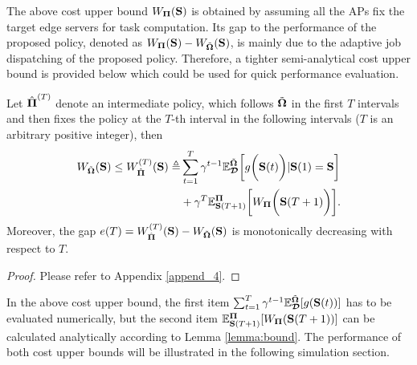 The above cost upper bound $W_{\boldsymbol{\Pi}}(\mathbf{S})$ is obtained by assuming all the APs fix the target edge servers for task computation.
Its gap to the performance of the proposed policy, denoted as $W_{\boldsymbol{\Pi}}(\mathbf{S}) - W_{\tilde{\boldsymbol{\Omega}}}(\mathbf{S})$, is mainly due to the adaptive job dispatching of the proposed policy.
Therefore, a tighter semi-analytical cost upper bound is provided below which could be used for quick performance evaluation.
\begin{lemma}
    Let $\hat{\boldsymbol{\Pi}}^{(T)}$ denote an intermediate policy, which follows $\tilde{\boldsymbol{\Omega}}$ in the first $T$ intervals and then fixes the policy at the $T$-th interval in the following intervals ($T$ is an arbitrary positive integer), then
    {\small
    \begin{align}
        W_{\tilde{\boldsymbol{\Omega}}}(\mathbf{S}) \leq W_{\hat{\boldsymbol{\Pi}}}^{(T)}(\mathbf{S})
        \triangleq &\sum_{t=1}^{T} \gamma^{t-1} \mathbb{E}^{\tilde{\boldsymbol{\Omega}}}_{\boldsymbol{\mathcal{D}}}\bigg[g\bigg(\mathbf{S}(t)\bigg) | \mathbf{S}(1)=\mathbf{S}\bigg]
        \\\nonumber
        &+\gamma^{T} \mathbb{E}^{\boldsymbol{\Pi}}_{\mathbf{S}(T+1)}\bigg[W_{\boldsymbol{\Pi}}\bigg(\mathbf{S}(T+1)\bigg)\bigg].
        \label{eqn:semi-bound}
    \end{align}
    }%
    Moreover, the gap $e(T) = W^{(T)}_{\hat{\boldsymbol{\Pi}}}(\mathbf{S}) - W_{\tilde{\boldsymbol{\Omega}}}(\mathbf{S})$ is monotonically decreasing with respect to $T$.
    \label{lemma:semi-bound}
\end{lemma}
\begin{proof}
    Please refer to Appendix \ref{append_4}.
\end{proof}
In the above cost upper bound, the first item $\sum_{t=1}^{T} \gamma^{t-1} \mathbb{E}^{\tilde{\boldsymbol{\Omega}}}_{\boldsymbol{\mathcal{D}}}[g(\mathbf{S}(t))]$ has to be evaluated numerically, but the second item $\mathbb{E}^{\boldsymbol{\Pi}}_{\mathbf{S}(T+1)}[{W_{\boldsymbol{\Pi}}(\mathbf{S}(T+1))}]$ can be calculated analytically according to Lemma \ref{lemma:bound}.
The performance of both cost upper bounds will be illustrated in the following simulation section.

